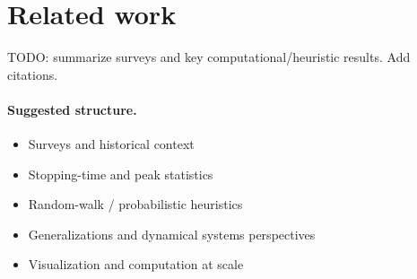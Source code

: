 \section{Related work}\label{sec:related-work}

TODO: summarize surveys and key computational/heuristic results. Add citations.

\paragraph{Suggested structure.}
\begin{itemize}
  \item Surveys and historical context
  \item Stopping-time and peak statistics
  \item Random-walk / probabilistic heuristics
  \item Generalizations and dynamical systems perspectives
  \item Visualization and computation at scale
\end{itemize}
